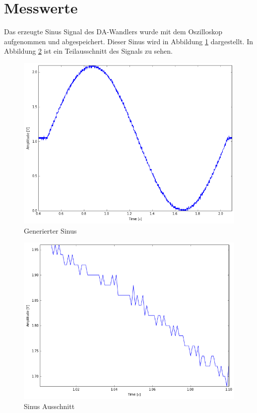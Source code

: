 \documentclass[12pt,oneside,a4paper]{report}
\begin{document}
\section{Messwerte}
\label{chap:VERSUCH_3_MESSWERTE}

Das erzeugte Sinus Signal des DA-Wandlers wurde mit dem Oszilloskop aufgenommen und abgespeichert. Dieser Sinus wird in Abbildung \ref{fig:SINUS} dargestellt.
In Abbildung \ref{fig:SINUS_A} ist ein Teilausschnitt des Signals zu sehen.

\begin{figure}[H]
\centering\small
\includegraphics[scale=0.5]{src/Sinus.png}
\caption{Generierter Sinus}
\label{fig:SINUS}
\end{figure}

\begin{figure}[H]
\centering\small
\includegraphics[scale=0.5]{src/Sinus_Ausschnitt.png}
\caption{Sinus Ausschnitt}
\label{fig:SINUS_A}
\end{figure}
\end{document}

